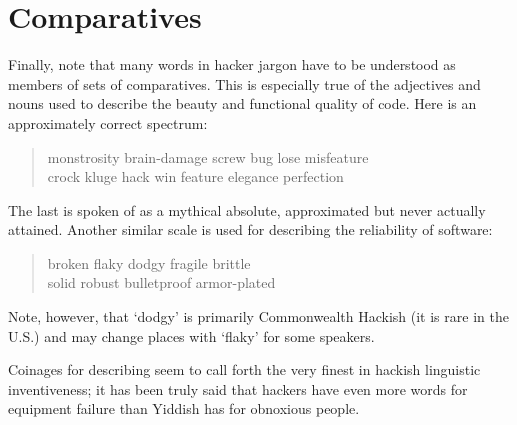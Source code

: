 \section*{Comparatives}\label{Comparatives}

	Finally, note that many words in hacker jargon have to be understood as
	members of sets of comparatives. This is especially true of the adjectives
	and nouns used to describe the beauty and functional quality of code. Here
	is an approximately correct spectrum:

	\begin{quote}
		monstrosity brain-damage screw bug lose misfeature\\
		crock kluge hack win feature elegance perfection
	\end{quote}

	The last is spoken of as a mythical absolute, approximated but never
	actually attained. Another similar scale is used for describing the
	reliability of software:

	\begin{quote}
		broken flaky dodgy fragile brittle\\
		solid robust bulletproof armor-plated
	\end{quote}

	Note, however, that `dodgy' is primarily Commonwealth Hackish (it is rare
	in the U.S.) and may change places with `flaky' for some speakers.

	Coinages for describing  seem to call forth the very
	finest in hackish linguistic inventiveness; it has been truly said that
	hackers have even more words for equipment failure than Yiddish has for
	obnoxious people.

